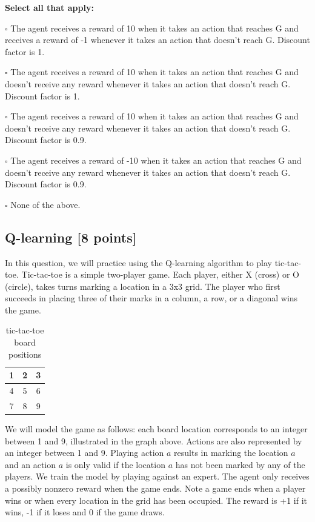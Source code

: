 \documentclass[11pt]{article}
\numberwithin{equation}{section} %
\numberwithin{figure}{section} %
\numberwithin{table}{section} %
\newcommand{\points}[1]{{\bf [#1 points]}}
\begin{document}
\begin{enumerate}
\textbf{Select all that apply:}
\begin{list}{}
    \item $\square$ The agent receives a reward of 10 when it takes an action that reaches G and receives a reward of -1 whenever it takes an action that doesn't reach G. Discount factor is 1.
    \item $\square$ The agent receives a reward of 10 when it takes an action that reaches G and doesn't receive any reward whenever it takes an action that doesn't reach G. Discount factor is 1.
    \item $\square$ The agent receives a reward of 10 when it takes an action that reaches G and doesn't receive any reward whenever it takes an action that doesn't reach G. Discount factor is 0.9.
    \item $\square$ The agent receives a reward of -10 when it takes an action that reaches G and doesn't receive any reward whenever it takes an action that doesn't reach G. Discount factor is 0.9.
    \item $\square$ None of the above.
\end{list}

\end{enumerate}

\clearpage

\subsection{Q-learning \points{8}}
In this question, we will practice using the Q-learning algorithm to play tic-tac-toe. Tic-tac-toe is a simple two-player game. Each player, either X (cross) or O (circle), takes turns marking a location in a 3x3 grid. The player who first succeeds in placing three of their marks in a column, a row, or a diagonal wins the game.

\begin{table}[H]
\begin{center}
  \begin{tabular}{  c | c | c  }
    1 & 2 & 3\\ \hline
    4 & 5 & 6 \\ \hline
    7 & 8 & 9 \\ 
  \end{tabular}
 \caption{tic-tac-toe board positions}
\end{center}
\end{table}

We will model the game as follows: each board location corresponds to an integer between 1 and 9, illustrated in the graph above. Actions are also represented by an integer between 1 and 9. Playing action $a$ results in marking the location $a$ and an action $a$ is only valid if the location $a$ has not been marked by any of the players. We train the model by playing against an expert. The agent only receives a possibly nonzero reward when the game ends. Note a game ends when a player wins or when every location in the grid has been occupied. The reward is +1 if it wins, -1 if it loses and 0 if the game draws.
\end{document}
